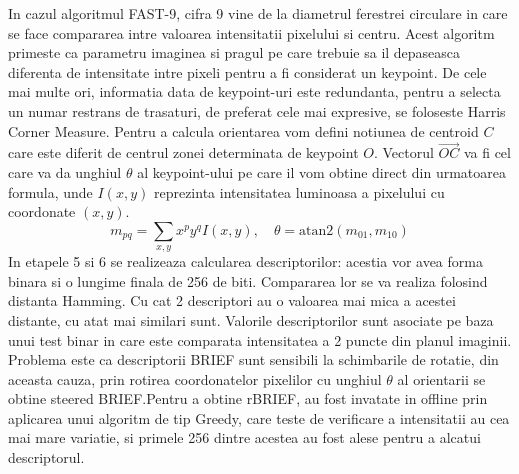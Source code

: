 \documentclass[12pt,a4paper]{report}
\begin{document}
In cazul algoritmul FAST-9, 
cifra 9 vine de la diametrul ferestrei circulare in care se face compararea intre valoarea 
intensitatii pixelului si centru. Acest algoritm primeste ca parametru imaginea si pragul 
pe care trebuie sa il depaseasca diferenta de intensitate intre pixeli pentru a fi considerat
un keypoint. De cele mai multe ori, informatia data de keypoint-uri este redundanta, pentru
a selecta un numar restrans de trasaturi, de preferat cele mai expresive, se foloseste Harris
Corner Measure.  Pentru a calcula orientarea vom defini notiunea de centroid  $ C $ care este
diferit de centrul zonei determinata de keypoint $ O $. Vectorul $ \vec{OC} $ va fi cel 
care va da unghiul $ \theta $ al keypoint-ului pe care il vom obtine direct din urmatoarea 
formula, unde $ I(x, y) $ reprezinta intensitatea luminoasa a pixelului cu coordonate $ (x, y) $.      
\begin{equation}
m_{pq} = \sum_{x, y} x^p y^q I(x, y), \quad{}
\theta = \text{atan2}(m_{01}, m_{10})
\end{equation}
In etapele 5 si 6 se realizeaza calcularea descriptorilor: acestia vor avea forma binara si o 
lungime finala de 256 de biti. Compararea lor se va realiza folosind distanta Hamming. Cu cat 
2 descriptori au o valoarea mai mica a acestei distante, cu atat mai similari sunt. Valorile 
descriptorilor sunt asociate pe baza unui test binar in care este comparata intensitatea a 2 
puncte din planul imaginii. Problema este ca descriptorii BRIEF sunt sensibili la schimbarile de
rotatie, din aceasta cauza, prin rotirea coordonatelor pixelilor cu unghiul $ \theta $ al 
orientarii se obtine steered BRIEF.\@ Pentru a obtine rBRIEF, au fost invatate in offline prin
aplicarea unui algoritm de tip Greedy, care teste de verificare a intensitatii au cea mai mare 
variatie, si primele 256 dintre acestea au fost alese pentru a alcatui descriptorul.       
\end{document}
